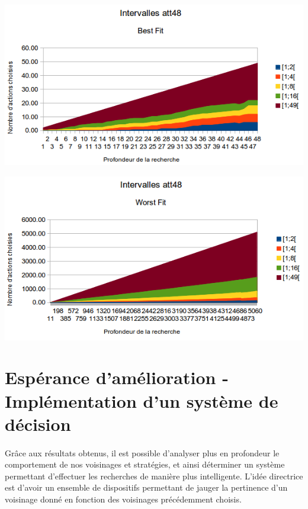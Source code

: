 \documentclass[a4paper,10pt]{report}
\begin{document}
\begin{center}
  \includegraphics[width=\textwidth]{images/att48-intervals-best-fit.png}
\end{center}

\begin{center}
  \includegraphics[width=\textwidth]{images/att48-intervals-worst-fit.png}
\end{center}



\section{Espérance d'amélioration - Implémentation d'un système de décision}

\paragraph{}
  Grâce aux résultats obtenus, il est possible d'analyser plus en profondeur le
comportement de nos voisinages et stratégies, et ainsi déterminer un système
permettant d'effectuer les recherches de manière plus intelligente. L'idée
directrice est d'avoir un ensemble de dispositifs permettant de jauger la
pertinence d'un voisinage donné en fonction des voisinages précédemment choisis.
\end{document}
